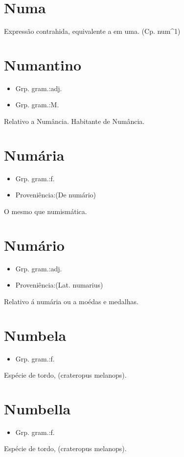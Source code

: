 \section{Numa}
Expressão contrahida, equivalente a \textunderscore em uma\textunderscore .
(Cp. \textunderscore num\textunderscore ^1)
\section{Numantino}
\begin{itemize}
\item {Grp. gram.:adj.}
\end{itemize}
\begin{itemize}
\item {Grp. gram.:M.}
\end{itemize}
Relativo a Numância.
Habitante de Numância.
\section{Numária}
\begin{itemize}
\item {Grp. gram.:f.}
\end{itemize}
\begin{itemize}
\item {Proveniência:(De \textunderscore numário\textunderscore )}
\end{itemize}
O mesmo que \textunderscore numismática\textunderscore .
\section{Numário}
\begin{itemize}
\item {Grp. gram.:adj.}
\end{itemize}
\begin{itemize}
\item {Proveniência:(Lat. \textunderscore numarius\textunderscore )}
\end{itemize}
Relativo á numária ou a moédas e medalhas.
\section{Numbela}
\begin{itemize}
\item {Grp. gram.:f.}
\end{itemize}
Espécie de tordo, (\textunderscore crateropus melanops\textunderscore ).
\section{Numbella}
\begin{itemize}
\item {Grp. gram.:f.}
\end{itemize}
Espécie de tordo, (\textunderscore crateropus melanops\textunderscore ).

